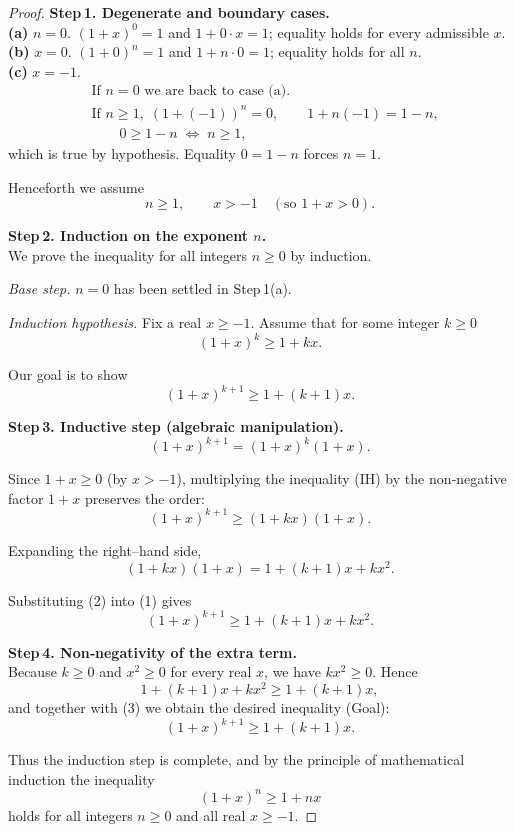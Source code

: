 \begin{proof}
\textbf{Step 1. Degenerate and boundary cases.}\\
\textbf{(a) }\(n=0\).  \((1+x)^{0}=1\) and \(1+0\cdot x=1\); equality holds for every admissible \(x\).\\
\textbf{(b) }\(x=0\).  \((1+0)^{n}=1\) and \(1+n\cdot0=1\); equality holds for all \(n\).\\
\textbf{(c) }\(x=-1\).  
\[
\begin{aligned}
&\text{If }n=0\text{ we are back to case (a).}\\
&\text{If }n\ge1,\;(1+(-1))^{n}=0,\qquad 1+n(-1)=1-n,\\
&\qquad 0\ge1-n\;\Longleftrightarrow\;n\ge1,
\end{aligned}
\]
which is true by hypothesis.  Equality \(0=1-n\) forces \(n=1\).

Henceforth we assume  
\[
n\ge1,\qquad x>-1\quad(\text{so }1+x>0).
\]

\textbf{Step 2. Induction on the exponent \(n\).}\\
We prove the inequality for all integers \(n\ge0\) by induction.

\emph{Base step.}  \(n=0\) has been settled in Step 1(a).  

\emph{Induction hypothesis.}  Fix a real \(x\ge-1\). Assume that for some integer \(k\ge0\)
\[
(1+x)^{k}\ge 1+kx.\tag{IH}
\]

Our goal is to show
\[
(1+x)^{k+1}\ge 1+(k+1)x.\tag{Goal}
\]

\textbf{Step 3. Inductive step (algebraic manipulation).}
\[
(1+x)^{k+1}=(1+x)^{k}(1+x).
\]

Since \(1+x\ge0\) (by \(x>-1\)), multiplying the inequality (IH) by the non‑negative factor \(1+x\) preserves the order:
\[
(1+x)^{k+1}\ge(1+kx)(1+x).\tag{1}
\]

Expanding the right–hand side,
\[
(1+kx)(1+x)=1+(k+1)x+kx^{2}.\tag{2}
\]

Substituting (2) into (1) gives
\[
(1+x)^{k+1}\ge 1+(k+1)x+kx^{2}.\tag{3}
\]

\textbf{Step 4. Non‑negativity of the extra term.}\\
Because \(k\ge0\) and \(x^{2}\ge0\) for every real \(x\), we have \(kx^{2}\ge0\).  Hence
\[
1+(k+1)x+kx^{2}\ge1+(k+1)x,
\]
and together with (3) we obtain the desired inequality (Goal):
\[
(1+x)^{k+1}\ge 1+(k+1)x.
\]

Thus the induction step is complete, and by the principle of mathematical induction the inequality
\[
(1+x)^{n}\ge 1+nx
\]
holds for all integers \(n\ge0\) and all real \(x\ge-1\).


\end{proof}
